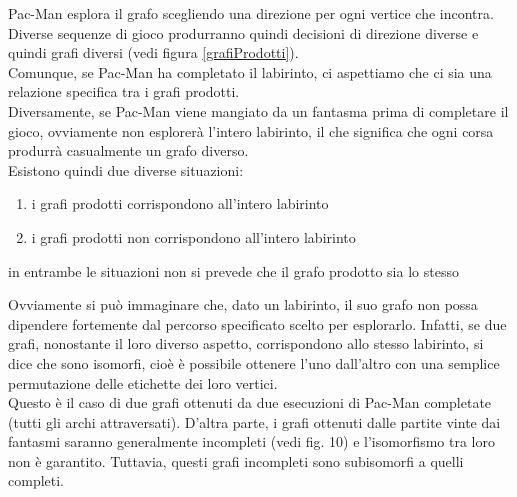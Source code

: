 \documentclass[8pt]{book}
\begin{document}
Pac-Man esplora il grafo scegliendo una direzione per ogni vertice che incontra. Diverse sequenze di gioco produrranno quindi decisioni di direzione diverse e quindi grafi diversi (vedi figura \ref{grafiProdotti}).\\
Comunque, se Pac-Man ha completato il labirinto, ci aspettiamo che ci sia una relazione specifica tra i grafi prodotti.\\
Diversamente, se Pac-Man viene mangiato da un fantasma prima di completare il gioco, ovviamente non esplorerà l'intero labirinto, il che significa che ogni corsa produrrà casualmente un grafo diverso.\\
Esistono quindi due diverse situazioni:

\begin{enumerate}
\def\labelenumi{\alph{enumi}.}
\item
  i grafi prodotti corrispondono all'intero labirinto
\item
  i grafi prodotti non corrispondono all'intero labirinto
\end{enumerate}

in entrambe le situazioni non si prevede che il grafo prodotto sia lo stesso

Ovviamente si può immaginare che, dato un labirinto, il suo grafo non possa dipendere fortemente dal percorso specificato scelto per esplorarlo. Infatti, se due grafi, nonostante il loro diverso aspetto, corrispondono allo stesso labirinto, si dice che sono isomorfi, cioè è possibile ottenere l'uno dall'altro con una semplice permutazione delle etichette dei loro vertici.\\
Questo è il caso di due grafi ottenuti da due esecuzioni di Pac-Man completate (tutti gli archi attraversati). D'altra parte, i grafi ottenuti dalle partite vinte dai fantasmi saranno generalmente incompleti (vedi fig. 10) e l'isomorfismo tra loro non è garantito. Tuttavia, questi grafi incompleti sono subisomorfi a quelli completi.
\end{document}

